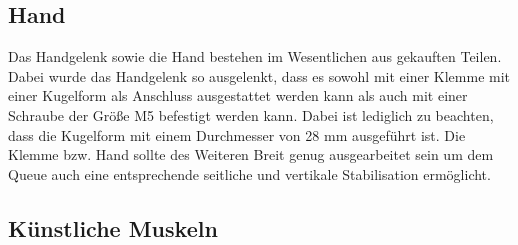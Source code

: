 		\subsection{Hand}
		Das Handgelenk sowie die Hand bestehen im Wesentlichen aus gekauften Teilen. Dabei wurde das Handgelenk so ausgelenkt, dass es sowohl mit einer Klemme mit einer Kugelform als Anschluss ausgestattet werden kann als auch mit einer Schraube der Größe M5 befestigt werden kann. Dabei ist lediglich zu beachten, dass die Kugelform mit einem Durchmesser von 28 mm ausgeführt ist. Die Klemme bzw. Hand sollte des Weiteren Breit genug ausgearbeitet sein um dem Queue auch eine entsprechende seitliche und vertikale Stabilisation ermöglicht. 
		\subsection{Künstliche Muskeln}
